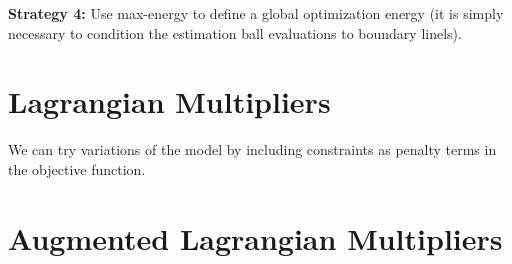 	\textbf{Strategy 4:} Use max-energy to define a global optimization energy (it is simply necessary to condition the estimation ball evaluations to boundary linels).
	
	
\section{Lagrangian Multipliers}

	We can try variations of the model by including constraints as penalty terms in the objective function.
	
	
\section{Augmented Lagrangian Multipliers}	

